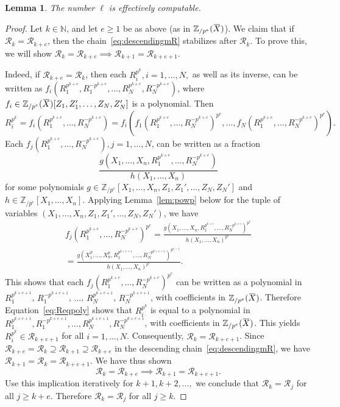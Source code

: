 \documentclass[letterpaper, 11pt, thm-restate]{article}
\numberwithin{equation}{section}
\newcommand{\N}{\mathbb{N}}
\newcommand{\Zpe}{\mathbb{Z}_{/p^e}}
\newcommand{\mR}{\mathcal{R}}
\newcommand{\red}{\textcolor{red}}
\newcommand{\oX}{\mkern 1.5mu\overline{\mkern-1.5mu X \mkern-1.5mu}\mkern 1.5mu}
\newtheorem{lem}[thrm]{Lemma}
\theoremstyle{definition}
\theoremstyle{definition}
\theoremstyle{definition}
\begin{document}
\begin{lem}\label{lem:stableffective}
    The number $\ell$ is effectively computable.
\end{lem}
\begin{proof}
    Let $k \in \N$, and let $e \geq 1$ be as above (as in $\Zpe(\oX)$). We claim that if $\mR_{k} = \mR_{k+e}$, %
    then the chain~\eqref{eq:descendingmR} stabilizes after $\mR_{k}$.
    To prove this, we will show $\mR_k = \mR_{k+e} \implies \mR_{k+1} = \mR_{k+e+1}$.

    Indeed, if $\mR_{k+e} = \mR_k$, then each $R_i^{p^k}, i = 1, \ldots, N,$ as well as its inverse, can be written as $f_i(R_1^{p^{k+e}}, R_1^{-p^{k+e}}, \ldots, R_N^{p^{k+e}}, R_N^{-p^{k+e}})$, where $f_i \in \Zpe(\oX)[Z_1, Z_1', \ldots, Z_N, Z_N']$ is a polynomial.
    Then
    \begin{equation}\label{eq:Reqpoly}
    R_i^{p^k} = f_i\left(R_1^{p^{k+e}}, \ldots, R_N^{-p^{k+e}}\right) = f_i\left(f_1\left(R_1^{p^{k+e}}, \ldots, R_N^{-p^{k+e}}\right)^{p^{e}}, \ldots, f_N\left(R_1^{p^{k+e}}, \ldots, R_N^{-p^{k+e}}\right)^{p^{e}}\right).
    \end{equation}
    Each $f_j\left(R_1^{p^{k+e}}, \ldots, R_N^{-p^{k+e}}\right), j = 1, \ldots, N$, can be written as a fraction
    \[
    \frac{g\left(X_1, \ldots, X_n, R_1^{p^{k+e}}, \ldots, R_N^{-p^{k+e}}\right)}{h(X_1, \ldots, X_n)}
    \]
    for some polynomials $g \in \Zpe[X_1, \ldots, X_n, Z_1, Z_1', \ldots, Z_N, Z_N']$ and $h \in \Zpe[X_1, \ldots, X_n]$.
    Applying Lemma~\ref{lem:powp} below for the tuple of variables $(X_1, \ldots, X_n, Z_1, Z_1', \ldots, Z_N, Z_N')$, we have
    \begin{multline*}
    f_j\left(R_1^{p^{k+e}}, \ldots, R_N^{-p^{k+e}}\right)^{p^{e}} = \frac{g\left(X_1, \ldots, X_n, R_1^{p^{k+e}}, \ldots, R_N^{-p^{k+e}}\right)^{p^{e}}}{h(X_1, \ldots, X_n)^{p^{e}}} \\
    = \frac{g\left(X_1^p, \ldots, X_n^p, R_1^{p^{k+e+1}}, \ldots, R_N^{-p^{k+e+1}}\right)^{p^{e-1}}}{h(X_1, \ldots, X_n)^{p^{e}}}.
    \end{multline*}
    This shows that each $f_j\left(R_1^{p^{k+e}}, \ldots, R_N^{-p^{k+e}}\right)^{p^{e}}$ can be written as a polynomial in $R_1^{p^{k+e+1}}$, $R_1^{-p^{k+e+1}}$, $\ldots$, $R_N^{p^{k+e+1}}$, $R_N^{-p^{k+e+1}}$, with coefficients in $\Zpe(\oX)$.
    Therefore Equation~\eqref{eq:Reqpoly} shows that $R_i^{p^k}$ is equal to a polynomial in $R_1^{p^{k+e+1}}, R_1^{-p^{k+e+1}}, \ldots, R_N^{p^{k+e+1}}, R_N^{-p^{k+e+1}}$, with coefficients in $\Zpe(\oX)$.
    This yields $R_i^{p^k} \in \mR_{k+e+1}$ for all $i = 1, \ldots, N$.
    Consequently, $\mR_{k} = \mR_{k+e+1}$.
    Since $\mR_{k+e} = \mR_k \supseteq \mR_{k+1} \supseteq \mR_{k+e}$ in the descending chain~\eqref{eq:descendingmR}, we have $\mR_{k+1} = \mR_k = \mR_{k+e+1}$.
    We have thus shown 
    \[
    \mR_k = \mR_{k+e} \implies \mR_{k+1} = \mR_{k+e+1}.
    \]
    Use this implication iteratively for $k+1, k+2, \ldots,$ we conclude that $\mR_{k} = \mR_{j}$ for all $j \geq k+e$.
    Therefore $\mR_{k} = \mR_{j}$ for all $j \geq k$. %
    

\end{proof}
\end{document}

